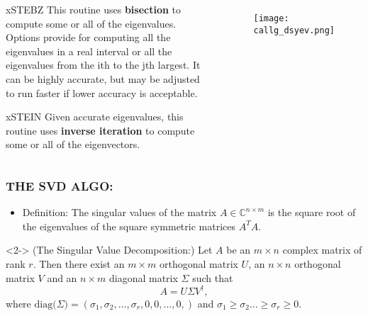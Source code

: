 \documentclass[a4paper,8pt]{beamer} %
\newcommand{\diag}[1]{\text{diag}{#1}}
\begin{document}
\begin{frame}
\begin{columns}[l]
\begin{enumerate}
\begin{footnotesize}
\item
xSTEBZ
    This routine uses \textbf{bisection} to compute some or all of the eigenvalues. Options provide for computing all the eigenvalues in a real interval or all the eigenvalues from the ith to the jth largest. It can be highly accurate, but may be adjusted to run faster if lower accuracy is acceptable. 
\item
xSTEIN
    Given accurate eigenvalues, this routine uses \textbf{inverse iteration} to compute some or all of the eigenvectors.
\end{footnotesize}
\end{enumerate}

%
\column{2.8cm}
%
\begin{figure}%
\begin{center}
\texttt{[image: callg\_dsyev.png]} 
\end{center}
\end{figure}
%
\end{columns}
\end{frame}%
\begin{frame} %
\frametitle{THE SVD ALGO:}
\begin{itemize}
	\item <1-> Definition: 
				The singular values of the matrix $A\in\mathbb C^{n\times m}$ is the 
				square root of the eigenvalues of the square symmetric matrices $A^TA$.%
\end{itemize}
		\begin{theorem} 
			(The Singular Value Decomposition:)
			Let $A$ be an $m\times n$ complex matrix of rank $r$. Then there exist an $m\times m$
			orthogonal matrix $U$, an $n\times n$ orthogonal matrix $V$ and an $n\times m$ diagonal 
			matrix $\Sigma$ such that 
			\begin{equation}
				A = U \Sigma V^\dagger,
			\end{equation}
			where $\diag (\Sigma) = (\sigma_1,\sigma_2,\dots,\sigma_r, 0,0,\dots,0,)$ and 
			$\sigma_1\ge\sigma_2\dots\ge\sigma_r\ge0$.
		\end{theorem}
\end{frame}%
\end{document}
